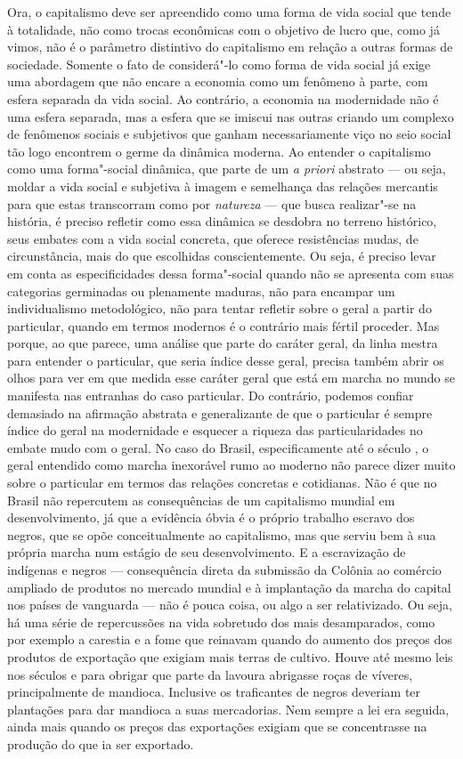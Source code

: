 Ora, o capitalismo deve ser apreendido como uma forma de vida social que
tende à totalidade, não como trocas econômicas com o objetivo de lucro
que, como já vimos, não é o parâmetro distintivo do capitalismo em
relação a outras formas de sociedade. Somente o fato de considerá"-lo
como forma de vida social já exige uma abordagem que não encare a
economia como um fenômeno à parte, com esfera separada da vida social.
Ao contrário, a economia na modernidade não é uma esfera separada, mas a
esfera que se imiscui nas outras criando um complexo de fenômenos
sociais e subjetivos que ganham necessariamente viço no seio social tão
logo encontrem o germe da dinâmica moderna. Ao entender o capitalismo
como uma forma"-social dinâmica, que parte de um \emph{a priori} abstrato
--- ou seja, moldar a vida social e subjetiva à imagem e semelhança das
relações mercantis para que estas transcorram como por \emph{natureza}
--- que busca realizar"-se na história, é preciso refletir como essa
dinâmica se desdobra no terreno histórico, seus embates com a vida
social concreta, que oferece resistências mudas, de circunstância, mais
do que escolhidas conscientemente. Ou seja, é preciso levar em conta as
especificidades dessa forma"-social quando não se apresenta com suas
categorias germinadas ou plenamente maduras, não para encampar um
individualismo metodológico, não para tentar refletir sobre o geral a
partir do particular, quando em termos modernos é o contrário mais
fértil proceder. Mas porque, ao que parece, uma análise que parte do
caráter geral, da linha mestra para entender o particular, que seria
índice desse geral, precisa também abrir os olhos para ver em que medida
esse caráter geral que está em marcha no mundo se manifesta nas
entranhas do caso particular. Do contrário, podemos confiar demasiado na afirmação
abstrata e generalizante de que o particular é sempre índice do geral na
modernidade e esquecer a riqueza das particularidades no embate mudo com
o geral. No caso do Brasil, especificamente até o século , o geral
entendido como marcha inexorável rumo ao moderno não parece dizer muito
sobre o particular em termos das relações concretas e cotidianas. Não é
que no Brasil não repercutem as consequências de um capitalismo mundial
em desenvolvimento, já que a evidência óbvia é o próprio trabalho
escravo dos negros, que se opõe conceitualmente ao capitalismo, mas que
serviu bem à sua própria marcha num estágio de seu desenvolvimento. E a
escravização de indígenas e negros --- consequência direta da submissão
da Colônia ao comércio ampliado de produtos no mercado mundial e à
implantação da marcha do capital nos países de vanguarda --- não é pouca
coisa, ou algo a ser relativizado. Ou seja, há uma série de repercussões
na vida sobretudo dos mais desamparados, como por exemplo a carestia e a
fome que reinavam quando do aumento dos preços dos produtos de
exportação que exigiam mais terras de cultivo. Houve até mesmo leis nos
séculos  e  para obrigar que parte da lavoura abrigasse roças
de víveres, principalmente de mandioca. Inclusive os traficantes de
negros deveriam ter plantações para dar mandioca a suas mercadorias. Nem
sempre a lei era seguida, ainda mais quando os preços das exportações
exigiam que se concentrasse na produção do que ia ser exportado.

